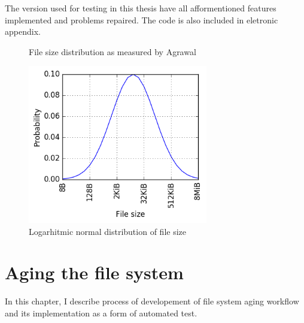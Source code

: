 \documentclass[
  color, %
  table, %
  lof,   %
  lot,   %
]{fithesis3}
\begin{document}
The version used for testing in this thesis have all afformentioned features implemented and problems repaired. The code is also included in eletronic appendix.

\begin{figure}
    \centering
    \caption{File size distribution as measured by Agrawal~\cite{agrawal2007five}}
    \label{fig:filedist}
\end{figure}

\begin{figure}%
    \begin{minipage}{\textwidth}
        \centering
        \includegraphics[width=0.7\textwidth]{../scripts/dist3.png}
        \caption{Logarhitmic normal distribution of file size}
\label{fig:lognormal}
    \end{minipage}
\end{figure}



\chapter{Aging the file system}
\label{aging}
In this chapter, I describe process of developement of file system aging workflow and its implementation as a form of automated test.
\end{document}
